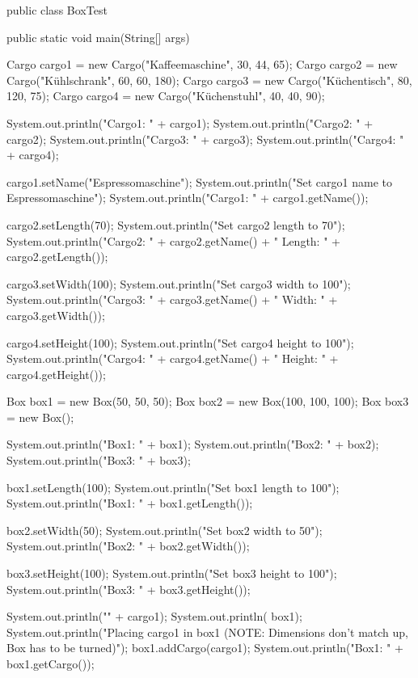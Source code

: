 \documentclass[a4paper,10pt, dvipsnames]{report}
\begin{document}
\begin{javacodebox}
public class BoxTest {
    
    public static void main(String[] args) {
        
        Cargo cargo1 = new Cargo("Kaffeemaschine", 30, 44, 65);
        Cargo cargo2 = new Cargo("Kühlschrank", 60, 60, 180);
        Cargo cargo3 = new Cargo("Küchentisch", 80, 120, 75);
        Cargo cargo4 = new Cargo("Küchenstuhl", 40, 40, 90);

        System.out.println("Cargo1: " + cargo1);
        System.out.println("Cargo2: " + cargo2);
        System.out.println("Cargo3: " + cargo3);
        System.out.println("Cargo4: " + cargo4);

        cargo1.setName("Espressomaschine");
        System.out.println("Set cargo1 name to Espressomaschine");
        System.out.println("Cargo1: " + cargo1.getName());

        cargo2.setLength(70);
        System.out.println("Set cargo2 length to 70");
        System.out.println("Cargo2: " + cargo2.getName() + " Length: " + cargo2.getLength());

        cargo3.setWidth(100);
        System.out.println("Set cargo3 width to 100");
        System.out.println("Cargo3: " + cargo3.getName() + " Width: " + cargo3.getWidth());

        cargo4.setHeight(100);
        System.out.println("Set cargo4 height to 100");
        System.out.println("Cargo4: " + cargo4.getName() + " Height: " + cargo4.getHeight());

        Box box1 = new Box(50, 50, 50);
        Box box2 = new Box(100, 100, 100);
        Box box3 = new Box();

        System.out.println("Box1: " + box1);
        System.out.println("Box2: " + box2);
        System.out.println("Box3: " + box3);

        box1.setLength(100);
        System.out.println("Set box1 length to 100");
        System.out.println("Box1: " + box1.getLength());

        box2.setWidth(50);
        System.out.println("Set box2 width to 50");
        System.out.println("Box2: " + box2.getWidth());

        box3.setHeight(100);
        System.out.println("Set box3 height to 100");
        System.out.println("Box3: " + box3.getHeight());

        System.out.println("\n" + cargo1);
        System.out.println( box1);
        System.out.println("Placing cargo1 in box1 (NOTE: Dimensions don't match up, Box has to be turned)");
        box1.addCargo(cargo1);
        System.out.println("Box1: " + box1.getCargo());

}}
\end{javacodebox}
\end{document}
